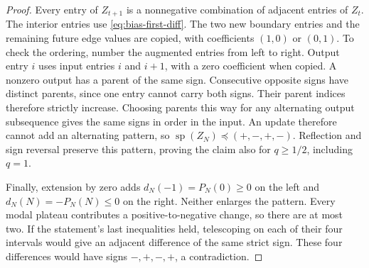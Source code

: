 \begin{proof}
Every entry of $Z_{t+1}$ is a nonnegative combination of adjacent entries
of $Z_t$. The interior entries use \eqref{eq:bias-first-diff}. The two new
boundary entries and the remaining future edge values are copied,
with coefficients $(1,0)$ or $(0,1)$. To check the ordering, number the augmented entries from left to
right. Output entry $i$ uses input entries $i$ and $i+1$, with a zero
coefficient when copied. A nonzero output
has a parent of the same sign. Consecutive opposite signs have distinct
parents, since one entry cannot carry both signs. Their parent indices
therefore strictly increase. Choosing parents this way for any alternating
output subsequence gives the same signs in order in the input.
An update therefore cannot add an alternating pattern, so
$\operatorname{sp}(Z_N)\preceq(+,-,+,-)$. Reflection and sign
reversal preserve this pattern, proving the claim also for $q\ge1/2$,
including $q=1$.

Finally, extension by zero adds $d_N(-1)=P_N(0)\ge0$ on the left and $d_N(N)=-P_N(N)\le0$ on the right. Neither enlarges the pattern.
Every modal plateau contributes a positive-to-negative change, so there
are at most two. If the statement's last inequalities held, telescoping
on each of their four intervals would give an adjacent difference
of the same strict sign. These four differences would
have signs $-,+,-,+$, a contradiction.
\end{proof}


